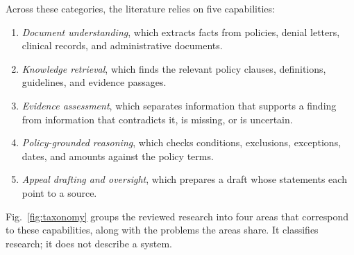 \documentclass[conference]{IEEEtran}
\begin{document}
Across these categories, the literature relies on five capabilities:
\begin{enumerate}
    \item \textit{Document understanding}, which extracts facts from policies, denial letters, clinical records, and administrative documents.
    \item \textit{Knowledge retrieval}, which finds the relevant policy clauses, definitions, guidelines, and evidence passages.
    \item \textit{Evidence assessment}, which separates information that supports a finding from information that contradicts it, is missing, or is uncertain.
    \item \textit{Policy-grounded reasoning}, which checks conditions, exclusions, exceptions, dates, and amounts against the policy terms.
    \item \textit{Appeal drafting and oversight}, which prepares a draft whose statements each point to a source.
\end{enumerate}

Fig.~\ref{fig:taxonomy} groups the reviewed research into four areas that correspond to these capabilities, along with the problems the areas share. It classifies research; it does not describe a system.
\end{document}
